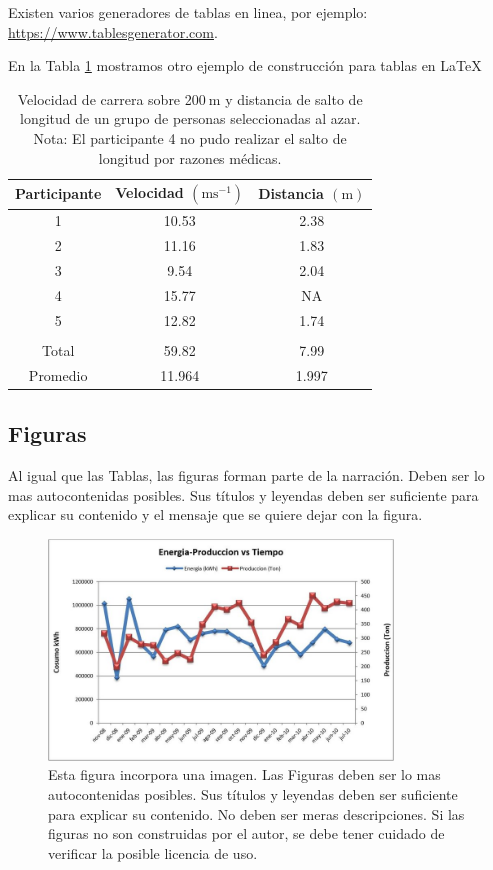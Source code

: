 \documentclass[spanish,notitlepage,letterpaper,11pt]{article} %
\begin{document}
Existen varios generadores de tablas en linea, por ejemplo: \url{https://www.tablesgenerator.com}. 

En la Tabla \ref{Tabla2} mostramos otro ejemplo de construcción para tablas en \LaTeX

\begin{table}[!ht]
\centering
\caption{Velocidad de carrera sobre 200$ \mathrm{~m}$ y distancia de salto de longitud  de un grupo de personas seleccionadas al azar.\\
Nota: El participante 4 no pudo realizar el salto de longitud  por razones médicas.}
  \vspace{0.3cm}
\begin{tabular}{ccc}
\hline Participante & Velocidad $\left(\mathrm{ms}^{-1}\right)$ & Distancia $(\mathrm{m})$ \\ \hline \hline 
1 & 10.53 & 2.38 \\
2 & 11.16 & 1.83 \\
3 &  9.54  & 2.04 \\
4 & 15.77 & NA \\
5 & 12.82 & 1.74 \\
& & \\
Total & 59.82 & 7.99 \\
Promedio & 11.964 & 1.997 \\
\hline
\end{tabular}
\label{Tabla2}
\end{table}


\subsection*{Figuras}
Al igual que las Tablas, las figuras forman parte de la narración. Deben ser lo mas autocontenidas posibles. Sus títulos y  leyendas deben ser suficiente para explicar su contenido y el mensaje que se quiere dejar con la figura. 
\begin{figure}[!ht]
\begin{center}
\includegraphics[width=3.6in]{figuras/fig01.png}
\caption{Esta figura incorpora una imagen. Las Figuras deben ser lo mas autocontenidas posibles. Sus títulos y  leyendas deben ser suficiente para explicar su contenido. No deben ser meras descripciones. Si las figuras no son construidas por el autor, se debe tener cuidado de verificar la posible licencia de uso.}
\label{Figura1}
\end{center}
\end{figure}
\end{document}
